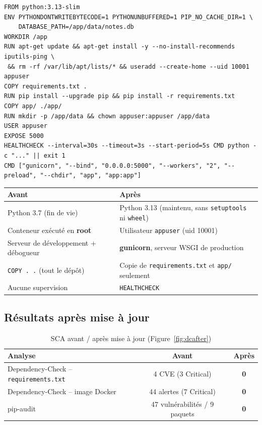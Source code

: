 \documentclass[11pt,a4paper]{article}
\newcommand{\code}[1]{\texttt{#1}}
\begin{document}
\begin{lstlisting}[caption={Dockerfile final (version \code{v2.0-secure})}]
FROM python:3.13-slim
ENV PYTHONDONTWRITEBYTECODE=1 PYTHONUNBUFFERED=1 PIP_NO_CACHE_DIR=1 \
    DATABASE_PATH=/app/data/notes.db
WORKDIR /app
RUN apt-get update && apt-get install -y --no-install-recommends iputils-ping \
 && rm -rf /var/lib/apt/lists/* && useradd --create-home --uid 10001 appuser
COPY requirements.txt .
RUN pip install --upgrade pip && pip install -r requirements.txt
COPY app/ ./app/
RUN mkdir -p /app/data && chown appuser:appuser /app/data
USER appuser
EXPOSE 5000
HEALTHCHECK --interval=30s --timeout=3s --start-period=5s CMD python -c "..." || exit 1
CMD ["gunicorn", "--bind", "0.0.0.0:5000", "--workers", "2", "--preload", "--chdir", "app", "app:app"]
\end{lstlisting}

\begin{table}[H]
\centering
\begin{tabularx}{\textwidth}{@{}LL@{}}
\toprule
\textbf{Avant} & \textbf{Après} \\
\midrule
Python 3.7 (fin de vie) & Python 3.13 (maintenu, sans \code{setuptools} ni \code{wheel}) \\
Conteneur exécuté en \textbf{root} & Utilisateur \code{appuser} (uid 10001) \\
Serveur de développement + débogueur & \textbf{gunicorn}, serveur WSGI de production \\
\code{COPY . .} (tout le dépôt) & Copie de \code{requirements.txt} et \code{app/} seulement \\
Aucune supervision & \code{HEALTHCHECK} \\
\bottomrule
\end{tabularx}
\end{table}

\subsection{Résultats après mise à jour}
\begin{table}[H]
\centering
\begin{tabular}{@{}lcc@{}}
\toprule
\textbf{Analyse} & \textbf{Avant} & \textbf{Après} \\
\midrule
Dependency-Check -- \code{requirements.txt} & 4 CVE (3 Critical) & \textbf{0} \\
Dependency-Check -- image Docker & 44 alertes (7 Critical) & \textbf{0} \\
pip-audit & 47 vulnérabilités / 9 paquets & \textbf{0} \\
\bottomrule
\end{tabular}
\caption{SCA avant / après mise à jour (Figure~\ref{fig:dcafter})}
\end{table}
\end{document}
